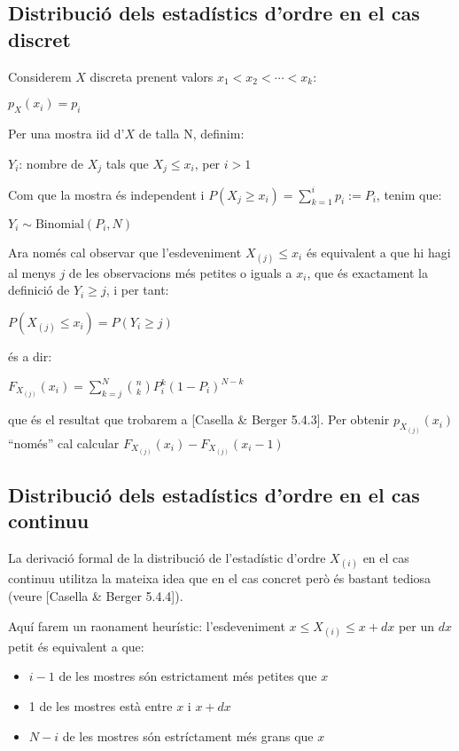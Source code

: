 \documentclass[letterpaper,10pt,english]{sphinxmanual}
\begin{document}
\subsection{Distribució dels estadístics d’ordre en el cas discret}
\label{\detokenize{0_Intro/0_2_Intro_stats:distribucio-dels-estadistics-d-ordre-en-el-cas-discret}}
Considerem \(X\) discreta prenent valors \(x_1 < x_2 < \cdots < x_k\):

\(p_X(x_i) = p_i\)

Per una mostra iid d’\(X\) de talla N, definim:

\(Y_i\): nombre de \(X_j\) tals que \(X_j \leq x_i\), per \(i>1\)

Com que la mostra és independent i \(P(X_j \geq x_i) = \sum_{k=1}^i p_i := P_i\),
tenim que:

\(Y_i \sim \mbox{Binomial}(P_i, N)\)

Ara només cal observar que l’esdeveniment \(X_{(j)} \leq x_i\)
és equivalent a que hi hagi al menys \(j\) de les observacions
més petites o iguals a \(x_i\), que és exactament la definició de
\(Y_i \geq j\), i per tant:

\(P(X_{(j)} \leq x_i) = P(Y_i \geq j)\)

és a dir:

\(F_{X_{(j)}}(x_i) = \sum_{k=j}^N {n \choose k} P_i^k(1-P_i)^{N-k}\)

que és el resultat que trobarem a {[}Casella \& Berger 5.4.3{]}. Per obtenir
\(p_{X_{(j)}}(x_i)\) “només” cal calcular \(F_{X_{(j)}}(x_i) - F_{X_{(j)}}(x_i-1)\)


\subsection{Distribució dels estadístics d’ordre en el cas continuu}
\label{\detokenize{0_Intro/0_2_Intro_stats:distribucio-dels-estadistics-d-ordre-en-el-cas-continuu}}
La derivació formal de la distribució de l’estadístic d’ordre \(X_{(i)}\)
en el cas continuu utilitza la mateixa idea que en el
cas concret però és bastant tediosa (veure {[}Casella \& Berger 5.4.4{]}).

Aquí farem un raonament heurístic: l’esdeveniment
\(x \leq X_{(i)} \leq x + dx\) per un \(dx\) petit
és equivalent a que:
\begin{itemize}
\item {} 
\(i-1\) de les mostres són estrictament més petites que \(x\)

\item {} 
1 de les mostres està entre \(x\) i \(x + dx\)

\item {} 
\(N-i\) de les mostres són estríctament més grans que \(x\)

\end{itemize}
\end{document}
